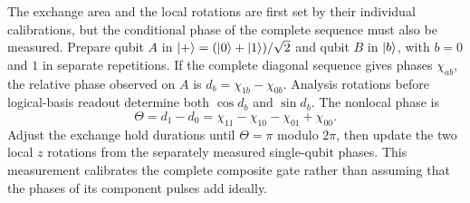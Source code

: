 The exchange area and the local rotations are first set by their
individual calibrations, but the conditional phase of the complete
sequence must also be measured. Prepare qubit $A$ in
$\lvert +\rangle=(\lvert 0\rangle+\lvert 1\rangle)/\sqrt2$ and qubit $B$ in $\lvert b\rangle$, with
$b=0$ and $1$ in separate repetitions. If the complete diagonal
sequence gives phases $\chi_{ab}$, the relative phase observed on
$A$ is $d_b=\chi_{1b}-\chi_{0b}$. Analysis rotations before
logical-basis readout determine both $\cos d_b$ and $\sin d_b$.
The nonlocal phase is
\begin{equation}
 \Theta=d_1-d_0
 =\chi_{11}-\chi_{10}-\chi_{01}+\chi_{00}.
 \label{eq:calibration-single-spin-conditional-phase}
\end{equation}
Adjust the exchange hold durations until
$\Theta=\pi$ modulo $2\pi$, then update the two local $z$ rotations
from the separately measured single-qubit phases. This measurement
calibrates the complete composite gate rather than assuming that
the phases of its component pulses add ideally.
